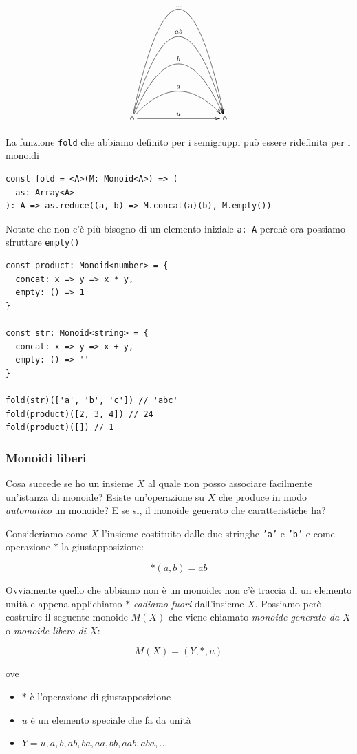 \documentclass[12pt]{article}
\begin{document}
\[
\xymatrixrowsep{3cm}
\xymatrixcolsep{3cm}
\xymatrix{
  \circ \ar[r]^u \ar@/^1cm/[r]^a \ar@/^2cm/[r]^b \ar@/^3cm/[r]^{ab} \ar@/^4cm/[r]^{\ldots} & \circ
}
\]

La funzione \texttt{fold} che abbiamo definito per i semigruppi può essere ridefinita per i monoidi

\begin{verbatim}
const fold = <A>(M: Monoid<A>) => (
  as: Array<A>
): A => as.reduce((a, b) => M.concat(a)(b), M.empty())
\end{verbatim}

Notate che non c'è più bisogno di un elemento iniziale \texttt{a: A} perchè ora possiamo sfruttare \texttt{empty()}

\begin{verbatim}
const product: Monoid<number> = {
  concat: x => y => x * y,
  empty: () => 1
}

const str: Monoid<string> = {
  concat: x => y => x + y,
  empty: () => ''
}

fold(str)(['a', 'b', 'c']) // 'abc'
fold(product)([2, 3, 4]) // 24
fold(product)([]) // 1
\end{verbatim}

\subsubsection{Monoidi liberi}

Cosa succede se ho un insieme $X$ al quale non posso associare facilmente un'istanza di monoide?
Esiste un'operazione su $X$ che produce in modo \emph{automatico} un monoide?
E se si, il monoide generato che caratteristiche ha?

Consideriamo come $X$ l'insieme costituito dalle due stringhe \texttt{'a'} e \texttt{'b'} e come operazione $*$ la giustapposizione:

$$
*(a, b) = ab
$$

Ovviamente quello che abbiamo non è un monoide: non c'è traccia di un elemento unità e appena applichiamo $*$ \emph{cadiamo fuori}
dall'insieme $X$. Possiamo però costruire il seguente monoide $M(X)$ che viene chiamato \emph{monoide generato da $X$} o \emph{monoide libero di $X$}:

$$
M(X) = (Y, *, u)
$$

ove

\begin{itemize}
  \item $*$ è l'operazione di giustapposizione
  \item $u$ è un elemento speciale che fa da unità
  \item $Y = { u, a, b, ab, ba, aa, bb, aab, aba, ... }$
\end{itemize}
\end{document}
